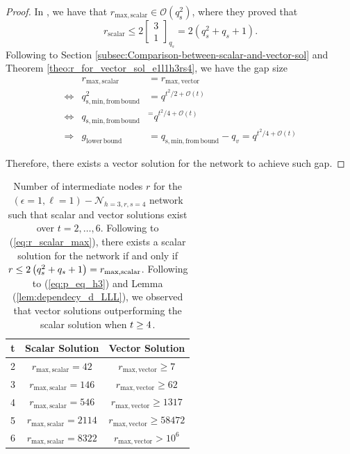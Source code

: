 \begin{proof}
In \cite[Sec. VIII-C]{Wachter-Zeh:2018}, we have that $r_{\mathrm{max,scalar}}\in\mathcal{O}\left(q_{\mathrm{s}}^{2}\right)$,
where they proved that
\begin{equation}
r_{\mathrm{scalar}}\leq2\left[\begin{array}{c}
3\\
1
\end{array}\right]_{q_{s}}=2\left(q_{s}^{2}+q_{s}+1\right).\label{eq:r_scalar_max}
\end{equation}
Following to Section \ref{subsec:Comparison-between-scalar-and-vector-sol}
and Theorem \ref{theo:r_for_vector_sol_e1l1h3rs4}, we have the gap
size 
\begin{eqnarray}
 & r_{\mathrm{max,scalar}} & =r_{\mathrm{max,vector}}\nonumber \\
\Leftrightarrow & q_{\mathrm{s,min,from\,bound}}^{2} & =q^{t^{2}/2+\mathcal{O}(t)}\nonumber \\
\Leftrightarrow & q_{\mathrm{s,min,from\,bound}} & ^{=}q^{t^{2}/4+\mathcal{O}(t)}\nonumber \\
\Rightarrow & g_{\mathrm{lower\,bound}} & =q_{\mathrm{s,min,from\,bound}}-q_{v}=q^{t^{2}/4+\mathcal{O}(t)}\label{eq:gap_e1l1h3rs4}
\end{eqnarray}

Therefore, there exists a vector solution for the network to achieve
such gap.
\end{proof}
\begin{table}[H]
\begin{centering}
\begin{tabular}{|c|c|c|}
\hline 
t & Scalar Solution & Vector Solution\tabularnewline
\hline 
\hline 
2 & $r_{\mathrm{max,scalar}}=42$ & $r_{\mathrm{max,vector}}\geq7$\tabularnewline
\hline 
3 & $r_{\mathrm{max,scalar}}=146$ & $r_{\mathrm{max,vector}}\geq62$ \tabularnewline
\hline 
4 & $r_{\mathrm{max,scalar}}=546$ & $r_{\mathrm{max,vector}}\geq1317$\tabularnewline
\hline 
5 & $r_{\mathrm{max,scalar}}=2114$ & $r_{\mathrm{max,vector}}\geq58472$\tabularnewline
\hline 
6 & $r_{\mathrm{max,scalar}}=8322$ & $r_{\mathrm{max,vector}}>10^{6}$\tabularnewline
\hline 
\end{tabular}
\par\end{centering}
\centering{}\caption{Number of intermediate nodes $r$ for the $\left(\epsilon=1,\ell=1\right)-\mathcal{N}_{h=3,r,s=4}$
network such that scalar and vector solutions exist over $t=2,\ldots,6$.
Following to (\ref{eq:r_scalar_max}), there exists a scalar solution
for the network if and only if $r\protect\leq2\left(q_{s}^{2}+q_{s}+1\right)=r_{\mathrm{max,scalar}}$.
Following to (\ref{eq:p_eq_h3}) and Lemma (\ref{lem:dependecy_d_LLL}),
we observed that vector solutions outperforming the scalar solution
when $t\protect\geq4$. \label{tab:r_over_t}}
\end{table}

